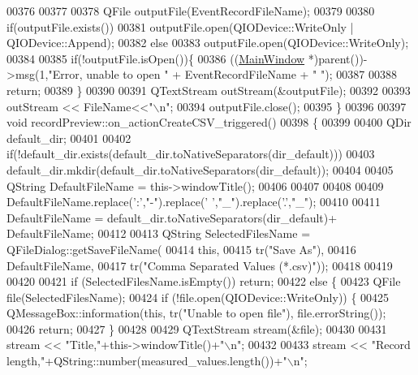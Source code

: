 \begin{DoxyCode}
00376 
00377 
00378        QFile outputFile(EventRecordFileName);
00379 
00380        \textcolor{keywordflow}{if}(outputFile.exists())
00381        outputFile.open(QIODevice::WriteOnly | QIODevice::Append);
00382        \textcolor{keywordflow}{else}
00383        outputFile.open(QIODevice::WriteOnly);
00384 
00385        \textcolor{keywordflow}{if}(!outputFile.isOpen())\{
00386            ((\hyperlink{a00006}{MainWindow} *)parent())->msg(1,\textcolor{stringliteral}{"Error, unable to open "} + EventRecordFileName + \textcolor{stringliteral}{" "});
00387 
00388             \textcolor{keywordflow}{return};
00389        \}
00390 
00391        QTextStream outStream(&outputFile);
00392 
00393        outStream << FileName<<\textcolor{stringliteral}{"\(\backslash\)n"};
00394        outputFile.close();
00395 \}
00396 
00397 \textcolor{keywordtype}{void} recordPreview::on\_actionCreateCSV\_triggered()
00398 \{
00399 
00400     QDir default\_dir;
00401 
00402     \textcolor{keywordflow}{if}(!default\_dir.exists(default\_dir.toNativeSeparators(dir\_default)))
00403         default\_dir.mkdir(default\_dir.toNativeSeparators(dir\_default));
00404 
00405     QString DefaultFileName = this->windowTitle();
00406 
00407 
00408 
00409     DefaultFileName.replace(\textcolor{charliteral}{':'},\textcolor{stringliteral}{"-"}).replace(\textcolor{charliteral}{' '},\textcolor{stringliteral}{"\_"}).replace(\textcolor{charliteral}{'.'},\textcolor{stringliteral}{"\_"});
00410 
00411     DefaultFileName = default\_dir.toNativeSeparators(dir\_default)+ DefaultFileName;
00412 
00413     QString SelectedFilesName = QFileDialog::getSaveFileName(
00414         \textcolor{keyword}{this},
00415         tr(\textcolor{stringliteral}{"Save As"}),
00416         DefaultFileName,
00417         tr(\textcolor{stringliteral}{"Comma Separated Values (*.csv)"}));
00418 
00419 
00420 
00421     \textcolor{keywordflow}{if} (SelectedFilesName.isEmpty()) \textcolor{keywordflow}{return};
00422     \textcolor{keywordflow}{else} \{
00423         QFile file(SelectedFilesName);
00424         \textcolor{keywordflow}{if} (!file.open(QIODevice::WriteOnly)) \{
00425             QMessageBox::information(\textcolor{keyword}{this}, tr(\textcolor{stringliteral}{"Unable to open file"}), file.errorString());
00426             \textcolor{keywordflow}{return};
00427         \}
00428 
00429         QTextStream stream(&file);
00430 
00431         stream << \textcolor{stringliteral}{"Title,"}+this->windowTitle()+\textcolor{stringliteral}{"\(\backslash\)n"};
00432 
00433         stream << \textcolor{stringliteral}{"Record length,"}+QString::number(measured\_values.length())+\textcolor{stringliteral}{"\(\backslash\)n"};

\end{DoxyCode}
